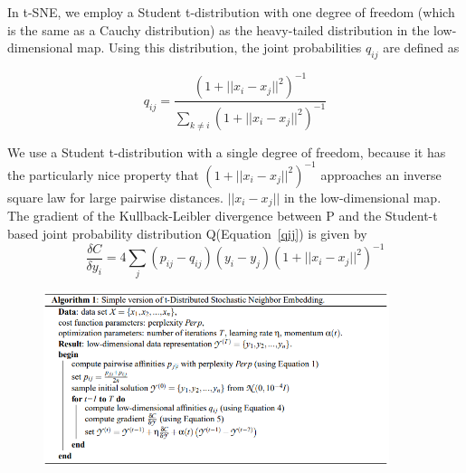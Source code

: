 \documentclass[12pt]{article}
\theoremstyle{plain}
\begin{document}
In t-SNE, we employ a Student t-distribution with one degree of freedom (which is the same as a Cauchy distribution) as the heavy-tailed distribution in the low-dimensional map. Using this
distribution, the joint probabilities $q_{ij}$ are defined as

\begin{equation}
q_{ij}= \frac{(1+||x_i-x_j||^2)^{-1}}{\sum_{k \neq i}(1+||x_i-x_j||^2)^{-1}}
\label{qij}
\end{equation}


We use a Student t-distribution with a single degree of freedom, because it has the particularly nice property that $(1+||x_i-x_j||^2)^{-1}$ approaches an inverse square law for large pairwise distances. $||x_i-x_j||$ in the low-dimensional map.
\\


The gradient of the Kullback-Leibler divergence between P and the Student-t based joint probability distribution Q(Equation~\ref{qij}) is given by
\begin{equation}
\frac{\delta C}{\delta y_i} = 4\sum_j(p_{ij}-q_{ij})(y_i-y_j)(1+||x_i-x_j||^2)^{-1}
\end{equation}

\begin{figure}[h!]
 \begin{center}
  \includegraphics[width=0.9\textwidth]{media/alg.png}
 \end{center}
\end{figure}

\newpage

\vfill



\end{document}
